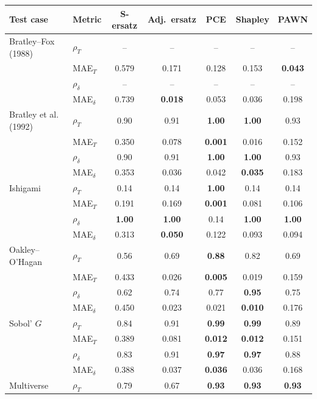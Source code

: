 \documentclass[11pt,a4paper]{article}
\begin{document}
\begin{table}[H]\centering\footnotesize
\begin{tabular}{@{}llccccc@{}}\toprule
Test case & Metric & S-ersatz & Adj.\ ersatz & PCE & Shapley & PAWN \\ \midrule
Bratley--Fox (1988) & $\rho_T$ & -- & -- & -- & -- & -- \\
 & MAE$_T$ & 0.579 & 0.171 & 0.128 & 0.153 & \textbf{0.043} \\
 & $\rho_\delta$ & -- & -- & -- & -- & -- \\
 & MAE$_\delta$ & 0.739 & \textbf{0.018} & 0.053 & 0.036 & 0.198 \\
\addlinespace[2pt]
Bratley et al. (1992) & $\rho_T$ & 0.90 & 0.91 & \textbf{1.00} & \textbf{1.00} & 0.93 \\
 & MAE$_T$ & 0.350 & 0.078 & \textbf{0.001} & 0.016 & 0.152 \\
 & $\rho_\delta$ & 0.90 & 0.91 & \textbf{1.00} & \textbf{1.00} & 0.93 \\
 & MAE$_\delta$ & 0.353 & 0.036 & 0.042 & \textbf{0.035} & 0.183 \\
\addlinespace[2pt]
Ishigami & $\rho_T$ & 0.14 & 0.14 & \textbf{1.00} & 0.14 & 0.14 \\
 & MAE$_T$ & 0.191 & 0.169 & \textbf{0.001} & 0.081 & 0.106 \\
 & $\rho_\delta$ & \textbf{1.00} & \textbf{1.00} & 0.14 & \textbf{1.00} & \textbf{1.00} \\
 & MAE$_\delta$ & 0.313 & \textbf{0.050} & 0.122 & 0.093 & 0.094 \\
\addlinespace[2pt]
Oakley--O'Hagan & $\rho_T$ & 0.56 & 0.69 & \textbf{0.88} & 0.82 & 0.69 \\
 & MAE$_T$ & 0.433 & 0.026 & \textbf{0.005} & 0.019 & 0.159 \\
 & $\rho_\delta$ & 0.62 & 0.74 & 0.77 & \textbf{0.95} & 0.75 \\
 & MAE$_\delta$ & 0.450 & 0.023 & 0.021 & \textbf{0.010} & 0.176 \\
\addlinespace[2pt]
Sobol' $G$ & $\rho_T$ & 0.84 & 0.91 & \textbf{0.99} & \textbf{0.99} & 0.89 \\
 & MAE$_T$ & 0.389 & 0.081 & \textbf{0.012} & \textbf{0.012} & 0.151 \\
 & $\rho_\delta$ & 0.83 & 0.91 & \textbf{0.97} & \textbf{0.97} & 0.88 \\
 & MAE$_\delta$ & 0.388 & 0.037 & \textbf{0.036} & 0.036 & 0.168 \\
\addlinespace[2pt]
Multiverse & $\rho_T$ & 0.79 & 0.67 & \textbf{0.93} & \textbf{0.93} & \textbf{0.93} \\

\end{tabular}
\end{table}
\end{document}
